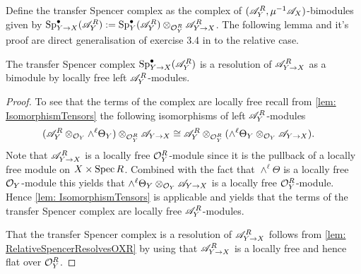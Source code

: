     Define the transfer Spencer complex as the complex of  $(\mathscr{A}_Y^R,\mu^{-1}\mathscr{A}_X)$-bimodules given by $\operatorname{Sp}^\bullet_{Y\to X}(\mathscr{A}_Y^R) := \operatorname{Sp}^\bullet_Y(\mathscr{A}_Y^R) \otimes_{\mathcal{O}_Y^R}\mathscr{A}_{Y \to X}^R$.
    The following lemma and it's proof are direct generalisation of exercise 3.4 in \cite{sabbah2011introduction} to the relative case.
    \begin{lemma}\label{lem: SpencerResolutionTransferModule}
      The transfer Spencer complex $\operatorname{Sp}^\bullet_{Y\to X}(\mathscr{A}_Y^R)$ is a resolution of $\mathscr{A}_{Y\to X}^R$ as a bimodule by locally free left $\mathscr{A}_Y^R$-modules.
    \end{lemma}
    \begin{proof}
       To see that the terms of the complex are locally free recall from \cref{lem: IsomorphismTensors} the following isomorphisms of left $\mathscr{A}_Y^R$-modules
        \begin{align*}
           (\mathscr{A}_Y^R \otimes_{\mathcal{O}_Y} \wedge^\ell\Theta_Y )\otimes_{\mathcal{O}_Y^R}\mathscr{A}_{Y\to X} &
           \cong \mathscr{A}_Y^R \otimes_{\mathcal{O}_Y^R}(  \wedge^\ell\Theta_Y \otimes_{\mathcal{O}_Y}\mathscr{A}_{Y\to X}).
        \end{align*}
      Note that $\mathscr{A}_{Y\to X}^R$ is a locally free $\mathcal{O}_Y^R$-module since it is the pullback of a locally free module on $X\times \operatorname{Spec} R$.
      Combined with the fact that $\wedge^\ell \Theta$ is a locally free $\mathcal{O}_Y$-module this yields that $ \wedge^\ell\Theta_Y \otimes_{\mathcal{O}_Y}\mathscr{A}_{Y\to X}$ is a locally free $\mathcal{O}_Y^R$-module.
      Hence \cref{lem: IsomorphismTensors} is applicable and yields that the terms of the transfer Spencer complex are locally free $\mathscr{A}_Y^R$-modules.

      That the transfer Spencer complex is a resolution of $\mathscr{A}_{Y\to X}^R$ follows from \cref{lem: RelativeSpencerResolvesOXR} by using that $\mathscr{A}_{Y\to X}^R$ is a locally free and hence flat over $\mathcal{O}_Y^R$.
    \end{proof}


